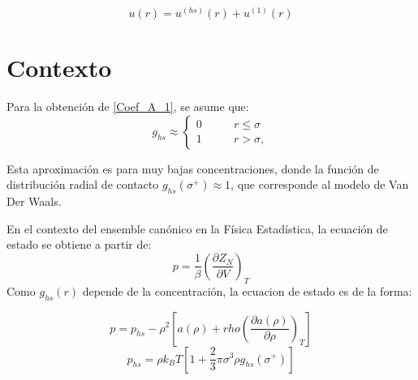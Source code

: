 \documentclass[12pt,letterpaper]{article}
\begin{document}
\begin{equation}
u(r) = u^{(hs)}(r) + u^{(1)}(r)
\label{PotInter_Base}
\end{equation}
\pagebreak

\section{Contexto}
Para la obtención de \eqref{Coef_A_1}, se asume que:
\begin{equation}
	 g_{hs}\approx
		\left\{
		\begin{aligned}
        	0 & \qquad r\leq \sigma\\
	        1 & \qquad r > \sigma ,
       \end{aligned}
       \right.
       \label{gdrhs}
\end{equation}

Esta aproximación es para muy bajas concentraciones, donde la función de distribución radial de contacto $g_{hs}(\sigma^+) \approx 1$, que corresponde al modelo de Van Der Waals.

En el contexto del ensemble canónico en la Física Estadística, la ecuación de estado se obtiene a partir de:
\begin{equation}
	p = \frac{1}{\beta} \left( \frac{\partial Z_N}{\partial V} \right)_{T}
	\label{EnsembleP}
\end{equation}
Como $g_{hs}(r)$ depende de la concentración, la ecuacion de estado es de la forma:

\begin{equation}
	p = p_{hs} - \rho^2\left[ a(\rho) + rho \left( \frac{\partial a(\rho)}{\partial\rho} \right)_T \right] 
	\label{Press}
\end{equation}
\begin{equation}
	p_{hs} = \rho k_B T\left[ 1 +\frac{2}{3}\pi\sigma^3\rho g_{hs}(\sigma^+) \right]
	\label{PressHS}
\end{equation}

\pagebreak
\end{document}

